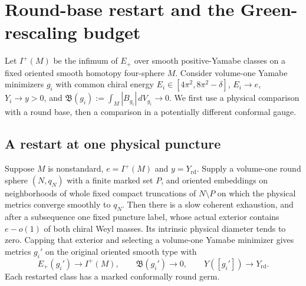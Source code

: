\section{Round-base restart and the Green-rescaling budget}
\label{alt:base}

Let \(I^+(M)\) be the infimum of \(E_+\) over smooth
positive-Yamabe classes on a fixed oriented smooth homotopy
four-sphere \(M\). Consider volume-one Yamabe minimizers \(g_i\)
with common chiral energy \(E_i\in[4\pi^2,8\pi^2-\delta]\),
\(E_i\to e\), \(Y_i\to y>0\), and
\(\mathfrak B(g_i):=\int_M|B_{g_i}|\,dV_{g_i}\to0\).
We first use a physical comparison with a round base, then a
comparison in a potentially different conformal gauge.

\subsection{A restart at one physical puncture}

\begin{theorem}\label{alt:restart}
Suppose \(M\) is nonstandard, \(e=I^+(M)\) and
\(y=Y_{\mathrm{rd}}\). Supply a volume-one round sphere
\((N,q_N)\) with a finite marked set \(P\), and oriented embeddings
on neighborhoods of whole fixed compact truncations of
\(N\setminus P\) on which the physical metrics converge smoothly
to \(q_N\). Then there is a slow coherent exhaustion, and after
a subsequence one fixed puncture label, whose actual exterior
contains \(e-o(1)\) of both chiral Weyl masses. Its intrinsic
physical diameter tends to zero. Capping that exterior and
selecting a volume-one Yamabe minimizer gives metrics \(g_i'\)
on the original oriented smooth type with
\[
 E_+(g_i')\to I^+(M),\qquad
 \mathfrak B(g_i')\to0,\qquad Y([g_i'])\to Y_{\mathrm{rd}} .
\]
Each restarted class has a marked conformally round germ.
\end{theorem}

